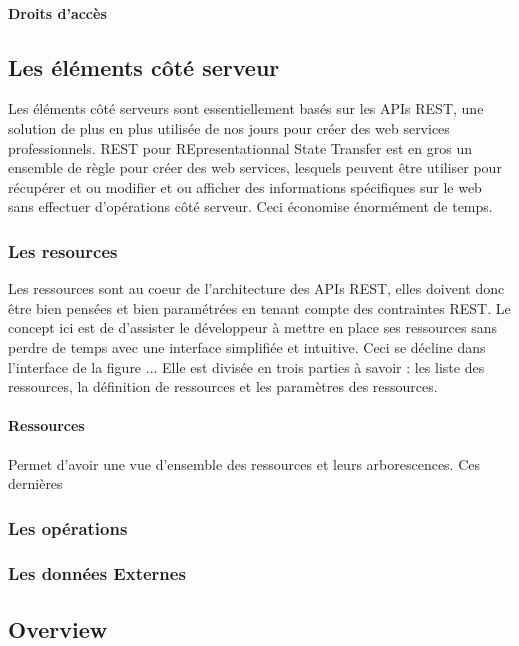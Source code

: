 \documentclass[a4paper,12pt]{article}
\begin{document}
\paragraph{Droits d'accès}

\subsection{Les éléments côté serveur}
Les éléments côté serveurs sont  essentiellement  basés sur les APIs REST,
une solution de plus en plus utilisée de nos jours pour créer des web services professionnels.
REST pour REpresentationnal  State Transfer est en gros  un ensemble de règle pour créer des web services,
lesquels peuvent être utiliser pour récupérer et ou modifier et ou afficher  des informations spécifiques sur le web
sans effectuer d'opérations côté serveur. Ceci économise  énormément de temps.
\subsubsection{Les resources}
 Les ressources  sont au coeur de l'architecture des APIs REST, elles doivent donc être
 bien pensées et bien paramétrées en tenant compte des contraintes REST. Le concept ici est de
 d'assister le développeur à mettre en place ses ressources sans perdre de temps avec une interface simplifiée
 et intuitive. Ceci se décline dans l'interface de la figure ... Elle est divisée en trois parties à savoir : les liste des
 ressources, la définition de ressources et les paramètres des ressources.
 \paragraph{Ressources}
 Permet d'avoir une vue d'ensemble des ressources et leurs arborescences. Ces dernières 

\subsubsection{Les opérations}
\subsubsection{Les données Externes}%

\subsection{Overview}
\end{document}
